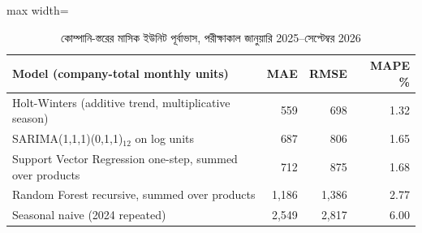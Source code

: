 \begin{table}[htbp]
\centering
\small
\caption{কোম্পানি-স্তরের মাসিক ইউনিট পূর্বাভাস, পরীক্ষাকাল জানুয়ারি 2025--সেপ্টেম্বর 2026}
\label{tab:company}
\begin{adjustbox}{max width=\linewidth}
\begin{tabular}{lrrr}
\toprule
\textbf{Model (company-total monthly units)} & \textbf{MAE} & \textbf{RMSE} & \textbf{MAPE \%} \\
\midrule
Holt-Winters (additive trend, multiplicative season) & 559 & 698 & 1.32 \\
SARIMA(1,1,1)(0,1,1)$_{12}$ on log units & 687 & 806 & 1.65 \\
Support Vector Regression one-step, summed over products & 712 & 875 & 1.68 \\
Random Forest recursive, summed over products & 1,186 & 1,386 & 2.77 \\
Seasonal naive (2024 repeated) & 2,549 & 2,817 & 6.00 \\
\bottomrule
\end{tabular}
\end{adjustbox}
\end{table}
